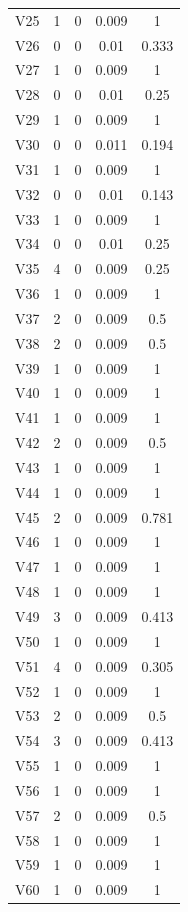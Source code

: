 \documentclass[a4paper, 12pt, openright, oneside, german, french, english, brazil]{abntex2}
\begin{document}
\begin{SingleSpace}
\begin{footnotesize}
\begin{center}
\begin{longtable}{c c c c c}
					V25 & 1 & 0 & 0.009 & 1 \\ 
					V26 & 0 & 0 & 0.01 & 0.333 \\ 
					V27 & 1 & 0 & 0.009 & 1 \\ 
					V28 & 0 & 0 & 0.01 & 0.25 \\ 
					V29 & 1 & 0 & 0.009 & 1 \\ 
					V30 & 0 & 0 & 0.011 & 0.194 \\ 
					V31 & 1 & 0 & 0.009 & 1 \\ 
					V32 & 0 & 0 & 0.01 & 0.143 \\ 
					V33 & 1 & 0 & 0.009 & 1 \\ 
					V34 & 0 & 0 & 0.01 & 0.25 \\ 
					V35 & 4 & 0 & 0.009 & 0.25 \\ 
					V36 & 1 & 0 & 0.009 & 1 \\ 
					V37 & 2 & 0 & 0.009 & 0.5 \\ 
					V38 & 2 & 0 & 0.009 & 0.5 \\ 
					V39 & 1 & 0 & 0.009 & 1 \\ 
					V40 & 1 & 0 & 0.009 & 1 \\ 
					V41 & 1 & 0 & 0.009 & 1 \\ 
					V42 & 2 & 0 & 0.009 & 0.5 \\ 
					V43 & 1 & 0 & 0.009 & 1 \\ 
					V44 & 1 & 0 & 0.009 & 1 \\ 
					V45 & 2 & 0 & 0.009 & 0.781 \\ 
					V46 & 1 & 0 & 0.009 & 1 \\ 
					V47 & 1 & 0 & 0.009 & 1 \\ 
					V48 & 1 & 0 & 0.009 & 1 \\ 
					V49 & 3 & 0 & 0.009 & 0.413 \\ 
					V50 & 1 & 0 & 0.009 & 1 \\ 
					V51 & 4 & 0 & 0.009 & 0.305 \\ 
					V52 & 1 & 0 & 0.009 & 1 \\ 
					V53 & 2 & 0 & 0.009 & 0.5 \\ 
					V54 & 3 & 0 & 0.009 & 0.413 \\ 
					V55 & 1 & 0 & 0.009 & 1 \\ 
					V56 & 1 & 0 & 0.009 & 1 \\ 
					V57 & 2 & 0 & 0.009 & 0.5 \\ 
					V58 & 1 & 0 & 0.009 & 1 \\ 
					V59 & 1 & 0 & 0.009 & 1 \\ 
					V60 & 1 & 0 & 0.009 & 1 \\ 

\end{longtable}
\end{center}
\end{footnotesize}
\end{SingleSpace}
\end{document}
